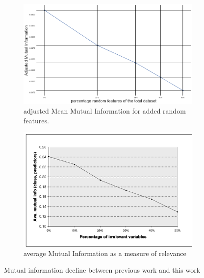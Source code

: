 \documentclass[a4paper,10pt]{article}
\begin{document}
\begin{figure}[H]
	\centering
	\begin{subfigure}[b]{0.45\textwidth}
		\includegraphics[width=\textwidth]{images/MutualInformationDecay.png}
		\caption{adjusted Mean Mutual Information for added random features.}
		\label{fig:AMMIdecay}
	\end{subfigure}
	\begin{subfigure}[b]{0.45\textwidth}
		\includegraphics[width=\textwidth]{images/MutualInformationDecay-paper.png}
		\caption{average Mutual Information as a measure of relevance}
		\label{fig:AMMIpaper}
	\end{subfigure}
	\caption{Mutual information decline between previous work and this work}
	\label{paper-thesis}
\end{figure}
\end{document}
